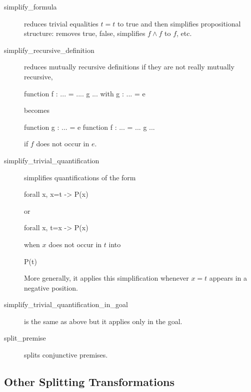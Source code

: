 \begin{description}
\item[simplify\_formula] reduces trivial equalities $t=t$ to true and
  then simplifies propositional structure: removes true, false, simplifies
  $f \land f$ to $f$, etc.

\item[simplify\_recursive\_definition] reduces mutually recursive
  definitions if they are not really mutually recursive, \eg
\begin{whycode}
function f : ... = .... g ...
with g : ... = e
\end{whycode}
becomes
\begin{whycode}
function g : ... = e
function f : ... = ... g ...
\end{whycode}
if $f$ does not occur in $e$.

\item[simplify\_trivial\_quantification]
  simplifies quantifications of the form
\begin{whycode}
forall x, x=t -> P(x)
\end{whycode}
or
\begin{whycode}
forall x, t=x -> P(x)
\end{whycode}
when $x$ does not occur in $t$ into
\begin{whycode}
P(t)
\end{whycode}
  More generally, it applies this simplification whenever $x=t$ appears
  in a negative position.

\item[simplify\_trivial\_quantification\_in\_goal]
  is the same as above but it applies only in the goal.

\item[split\_premise]
  splits conjunctive premises.

\end{description}

\subsection{Other Splitting Transformations}

